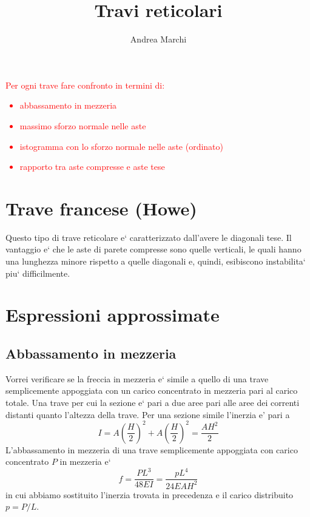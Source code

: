 \documentclass[a4paper]{article}
\begin{document}
\title{Travi reticolari}
\author{Andrea Marchi}

\maketitle

\textcolor{red}{Per ogni trave fare confronto in termini di:
\begin{itemize}
\item abbassamento in mezzeria
\item massimo sforzo normale nelle aste
\item istogramma con lo sforzo normale nelle aste (ordinato)
\item rapporto tra aste compresse e aste tese
\end{itemize}
}






\section{Trave francese (Howe)}

Questo tipo di trave reticolare e` caratterizzato dall'avere le diagonali tese. Il vantaggio e` che le aste di parete compresse sono quelle verticali, le quali hanno una lunghezza minore rispetto a quelle diagonali e, quindi, esibiscono instabilita` piu` difficilmente.







\section{Espressioni approssimate}

\subsection{Abbassamento in mezzeria}

Vorrei verificare se la freccia in mezzeria e` simile a quello di una trave semplicemente appoggiata con un carico concentrato in mezzeria pari al carico totale. Una trave per cui la sezione e` pari a due aree pari alle aree dei correnti distanti quanto l'altezza della trave.
Per una sezione simile l'inerzia e' pari a
$$ I = A \left(\frac{H}{2}\right)^2 + A \left(\frac{H}{2}\right)^2 = \frac{AH^2}{2} $$
L'abbassamento in mezzeria di una trave semplicemente appoggiata con carico concentrato $P$ in mezzeria e`
$$ f = \frac{PL^3}{48EI} = \frac{pL^4}{24EAH^2} $$
in cui abbiamo sostituito l'inerzia trovata in precedenza e il carico distribuito $p = P/L$.
\end{document}

